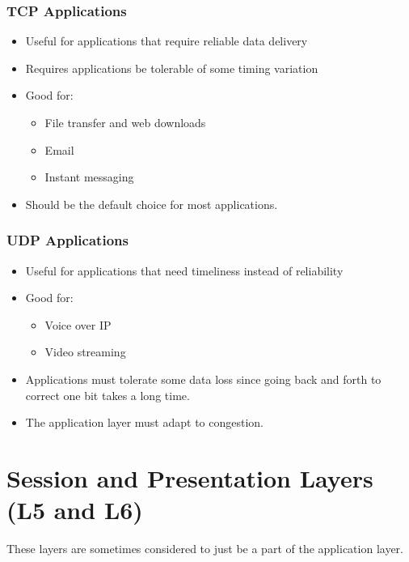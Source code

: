 \subsubsection{TCP Applications}\label{ssub:tcp_applications}

\begin{itemize}
    \item Useful for applications that require reliable data delivery
    \item Requires applications be tolerable of some timing variation
    \item Good for:
          \begin{itemize}
              \item File transfer and web downloads
              \item Email
              \item Instant messaging
          \end{itemize}
    \item Should be the default choice for most applications.
\end{itemize}

\subsubsection{UDP Applications}\label{ssub:udp_applications}

\begin{itemize}
    \item Useful for applications that need timeliness instead of reliability
    \item Good for:
          \begin{itemize}
              \item Voice over IP
              \item Video streaming
          \end{itemize}
    \item Applications must tolerate some data loss since going back and forth to correct one bit takes a long time.
    \item The application layer must adapt to congestion.
\end{itemize}

\section{Session and Presentation Layers (L5 and L6)}\label{sec:session_and_presentation_layers_l5_and_l6_}

\begin{note}
    These layers are sometimes considered to just be a part of the application layer.
\end{note}

